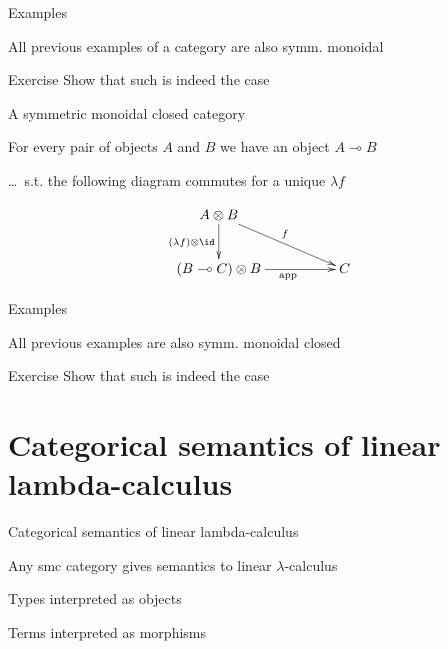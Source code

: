 \documentclass{beamer}
\begin{document}
\begin{frame}{Examples}

        All previous examples of a category are also symm. monoidal

        \bigskip
        \begin{block}{Exercise}
                Show that such is indeed the case 
        \end{block}
\end{frame}

\begin{frame}{A symmetric monoidal closed category}

        For every pair of objects $A$ and $B$ we 
        have an object $A \multimap B$

        \pause
        \dots\ s.t. the following diagram commutes
        for a \alert{unique} $\lambda f$

        \[
               \xymatrix@C=50pt{
                       A \otimes B \ar[dr]^{f} 
                       \ar@{->}[d]_{(\lambda f) \otimes \id}
                       \\
                       (B \multimap C) \otimes B \ar[r]_(0.55){\mathrm{app}} & C
               }
        \]

        \pause
\end{frame}

\begin{frame}{Examples}

        All previous examples are also symm. monoidal closed

        \bigskip
        \begin{block}{Exercise}
                Show that such is indeed the case 
        \end{block}
\end{frame}


\section{Categorical semantics of linear lambda-calculus}

\begin{frame}{Categorical semantics of linear lambda-calculus}

        Any smc category gives semantics to linear $\lambda$-calculus

        \medskip
        Types interpreted as objects

        \medskip
        Terms interpreted as morphisms
\end{frame}
\end{document}
